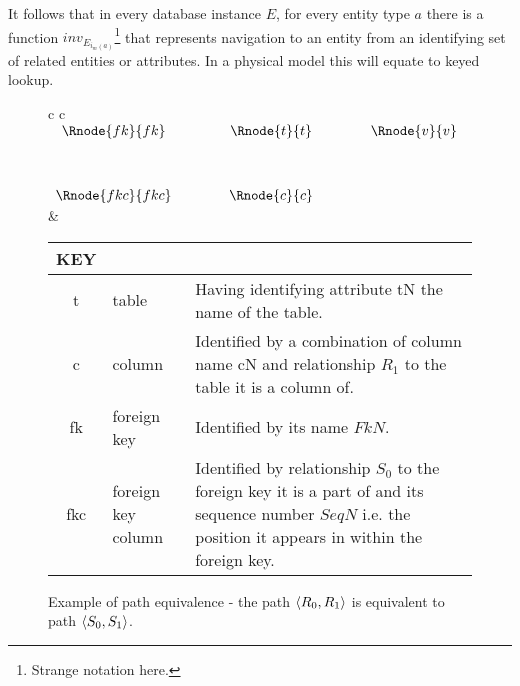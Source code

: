 \documentclass[10pt,a4paper]{article}
\newcommand{\genericmodel}{\mathcal{M}}
\renewcommand{\genericmodel}{{m}}
\newcommand{\iedges}[2] [\genericmodel]{i_{#1}(#2)}
\begin{document}
\noindent It follows that in every database instance $E$, for every entity type $a$ there is a function 
$inv_{E_{\iedges{a}}}$\footnote{Strange notation here.}  that represents navigation to an entity from an identifying set of related entities or attributes. 
In a physical model this will equate to keyed lookup. \\

\begin{figure} [h]
\begin{center}
\begin{tabular}{c c}
$
\begin{array}{cp{0.75cm}cp{0.75cm}c}
   \Rnode{fk}{fk}     & & \Rnode{t}{t} & & \Rnode{v}{v} \\[1.2cm]     
	 \Rnode{fkc}{fkc}   & & \Rnode{c}{c} & &               
\end{array}
$
\idcomp
{} 
\idcomp
{}
\idcomp
{}
\idcomp
{}
\idcomp
{}
\idcomp
& \footnotesize
\begin{tabular}{c p{1.5cm} p{4cm}}
KEY && \\
\hline
t & table & Having identifying attribute tN the name of the table. \\
c & column & Identified by a combination of column name cN and relationship $R_1$ to the table it is a column of.\\
fk & foreign key & Identified by its name $FkN$.\\
fkc & foreign key column & Identified by relationship $S_0$ to the foreign key it is a part of and its sequence number $SeqN$ i.e. the position it appears in within the foreign key. \\
\end{tabular} 
\end{tabular}
\end{center}
\caption{Example of path equivalence - the path $\langle R_0,R_1\rangle$ is equivalent to path $\langle S_0,S_1\rangle$.}
\label{foreignkeygraph}
\end{figure}
\end{document}
